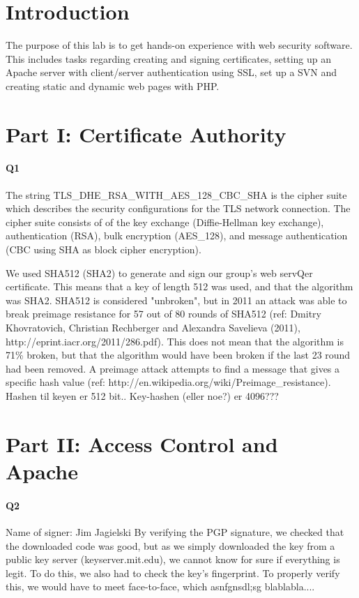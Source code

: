 \documentclass[11pt, a4paper]{article}
\begin{document}
\section{Introduction}
The purpose of this lab is to get hands-on experience with web security software. This includes tasks regarding creating and signing certificates, setting up an Apache server with client/server authentication using SSL, set up a SVN and creating static and dynamic web pages with PHP. 
\section{Part I: Certificate Authority}
\paragraph{Q1} 
The string TLS\_DHE\_RSA\_WITH\_AES\_128\_CBC\_SHA is the cipher suite which describes the security configurations for the TLS network connection. The cipher suite consists of of the key exchange (Diffie-Hellman key exchange), authentication (RSA), bulk encryption (AES\_128), and message authentication (CBC using SHA as block cipher encryption). 

We used SHA512 (SHA2) to generate and sign our group's web servQer certificate. This means that a key of length 512 was used, and that the algorithm was SHA2. SHA512 is considered "unbroken", but in 2011 an attack was able to break preimage resistance  for 57 out of 80 rounds of SHA512 (ref: Dmitry Khovratovich, Christian Rechberger and Alexandra Savelieva (2011), http://eprint.iacr.org/2011/286.pdf). This does not mean that the algorithm is 71\% broken, but that the algorithm would have been broken if the last 23 round had been removed. A preimage attack attempts to find a message that gives a specific hash value (ref: http://en.wikipedia.org/wiki/Preimage\_resistance).
Hashen til keyen er 512 bit.. Key-hashen (eller noe?) er 4096???
\section{Part II: Access Control and Apache}
\paragraph{Q2}
Name of signer: Jim Jagielski
By verifying the PGP signature, we checked that the downloaded code was good, but as we simply downloaded the key from a public key server (keyserver.mit.edu), we cannot know for sure if everything is legit. To do this, we also had to check the key's fingerprint. To properly verify this, we would have to meet face-to-face, which asnfgnsdl;sg blablabla....
\end{document}
